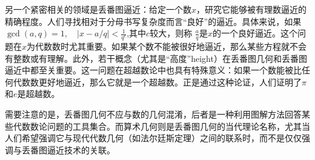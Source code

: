 另一个紧密相关的领域是丢番图逼近：给定一个数$x$，研究它能够被有理数逼近的精确程度。人们寻找相对于分母书写复杂度而言“良好”的逼近。具体来说，如果$\gcd(a,q)=1, \quad \left|x-a/q\right| < \frac{1}{q^{c}}$,其中$c$较大，则称 $\tfrac{a}{q}$是$x$的一个良好逼近。这个问题在$x$为代数数时尤其重要。如果某个数不能被很好地逼近，那么某些方程就不会有整数或有理解。此外，若干概念（尤其是“高度”height）在丢番图几何和丢番图逼近中都至关重要。这一问题在超越数论中也具有特殊意义：如果一个数能被比任何代数数更好地逼近，那么它就是一个超越数。正是通过这种论证，人们证明了$\pi$和$e$是超越数。

需要注意的是，丢番图几何不应与数的几何混淆，后者是一种利用图解方法回答某些代数数论问题的工具集合。而算术几何则是丢番图几何的当代理论名称，尤其当人们希望强调它与现代代数几何（如法尔廷斯定理）之间的联系时，而不是仅仅强调与丢番图逼近技术的关联。

